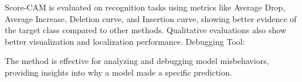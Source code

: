 Score-CAM is evaluated on recognition tasks using metrics like Average Drop, Average Increase, Deletion curve, and Insertion curve, showing better evidence of the target class compared to other methods.
Qualitative evaluations also show better visualization and localization performance.
Debugging Tool:

The method is effective for analyzing and debugging model misbehaviors, providing insights into why a model made a specific prediction.

